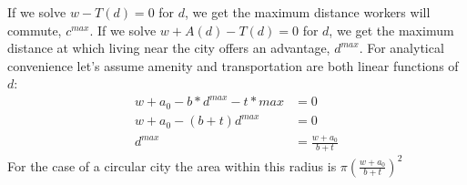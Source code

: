  If we solve $w-T(d)=0$ for $d$, we get the maximum  distance workers will commute, $c^{max}$. 
If we solve $w+A(d)-T(d)=0$ for $d$, we get the maximum  distance at which living near the city offers an advantage, $d^{max}$. For analytical convenience let's assume amenity and transportation are both linear functions of $d$:
\begin{eqnarray}
w+ a_0 - b*d^{max} - t*{max}  	&=0		\nonumber \\
w+a_0 - (b+t)d^{max}  	&=0			\nonumber \\
d^{max}				&= \frac{w+a_0}{b+t}
\end{eqnarray}
For the case of a circular city the area within this radius is $\pi \left(\frac{w+a_0}{b+t}\right)^2$ 

